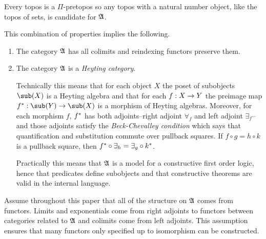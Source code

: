 \documentclass[csh.tex]{subfiles}
\begin{document}
\begin{example} Every topos is a $\Pi$-pretopos so any topos with a natural number object, like the topos of sets, is candidate for $\mathfrak A$. \end{example}

This combination of properties implies the following.
\begin{enumerate}
\item The category $\mathfrak A$ has all colimits and reindexing functors preserve them. 
\item The category $\mathfrak A$ is a \emph{Heyting category}. 

Technically this means that for each object $X$ the poset of subobjects $\sub(X)$ is a Heyting algebra and that for each $f: X\to Y$ the preimage map $f\ri\of\sub(Y)\to\sub(X)$ is a morphism of Heyting algebras. Moreover, for each morphism $f$, $f^*$ has both adjoints--right adjoint $\forall_f$ and left adjoint $\exists_f$--and those adjoints satisfy the \emph{Beck-Chevalley condition} which says that quantification and substitution commute over pullback squares. If $f\circ g = h\circ k$ is a pullback square, then $f^*\circ\exists_h=\exists_g\circ k^*$.

Practically this means that $\mathfrak A$ is a model for a constructive first order logic, hence that predicates define subobjects and that constructive theorems are valid in the internal language.
\end{enumerate}

\begin{remark} Assume throughout this paper that all of the structure on $\mathfrak A$ comes from functors. Limits and exponentials come from right adjoints to functors between categories related to $\mathfrak A$ and colimits come from left adjoints. This assumption ensures that many functors only specified up to isomorphism can be constructed.
\end{remark}
\end{document}
